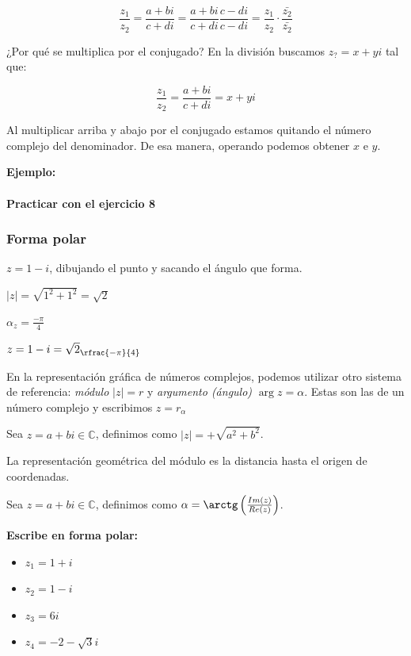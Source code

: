 \[
\frac{z_1}{z_2} = \frac{a+bi}{c+di} = \frac{a+bi}{c+di} \frac{c-di}{c-di} = \frac{z_1}{z_2}·\frac{\bar{z_2}}{\bar{z_2}}
\]

¿Por qué se multiplica por el conjugado? En la división buscamos $z_? = x+yi$ tal que:

\[\frac{z_1}{z_2} = \frac{a+bi}{c+di} = x+yi\]

Al multiplicar arriba y abajo por el conjugado estamos quitando el número complejo del denominador. De esa manera, operando podemos obtener $x$ e $y$.


\textbf{Ejemplo: }


\paragraph{Practicar con el ejercicio 8} 

\subsubsection{Forma polar}


\begin{example}
 $z = 1-i$, dibujando el punto y sacando el ángulo que forma. 

$|z| = \sqrt{1^2+1^2} = \sqrt{2}$

$\alpha_z = \frac{-\pi}{4}$

$z = 1-i = \sqrt{2}_{\rfrac{-\pi}{4}}$

\end{example}

En la representación gráfica de números complejos, podemos utilizar otro sistema de referencia: \textit{módulo} $|z|=r$ y \textit{argumento (ángulo)} $\arg{z} = α$. 
%
Estas son las  de un número complejo y escribimos $z = r_α$


Sea $z=a+bi \in\mathbb{C}$, definimos  como $|z| = +\sqrt{a^2+b^2}$.

\obs La representación geométrica del módulo es la distancia hasta el origen de coordenadas.

Sea $z=a+bi \in\mathbb{C}$, definimos  como $\alpha = \arctg\left(\frac{Im(z)}{Re(z)}\right)$.


\textbf{Escribe en forma polar:}
\begin{itemize}
	\item $z_1 = 1+i$
	\item $z_2 = 1-i$
	\item $z_3 = 6i$
	\item $z_4 = -2-\sqrt{3}i$
\end{itemize}


